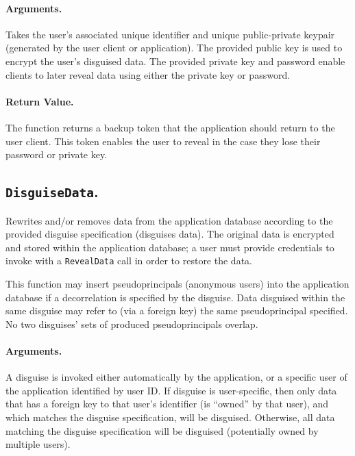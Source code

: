     \paragraph{Arguments.} Takes the user's associated unique identifier and unique
    public-private keypair (generated by the user
    client or application).
    The provided public key is used to encrypt the user's disguised data. The
    provided private key and password enable clients to later reveal data using
    either the private key or password.

    \paragraph{Return Value.} 
    The function returns a backup token that the application should return to
    the user client. This token enables the user to reveal in the case they lose
    their password or private key.


\subsection{\texttt{DisguiseData}.}

    Rewrites and/or removes data from the application database according to the
    provided disguise specification (\ie disguises data). The original data is encrypted
    and stored within the application database; a user must provide credentials
    to invoke with a \texttt{RevealData} call in order to restore the data.
    
    This function may insert pseudoprincipals (anonymous users) into the
    application database if a decorrelation is specified by the disguise.
     Data disguised within the
    same disguise may refer to (via a foreign key) the same pseudoprincipal
    specified.
    No two disguises' sets of produced pseudoprincipals overlap. 

    \paragraph{Arguments.} 
    A disguise is invoked either automatically by the application, or a specific
    user of the application identified by user ID. 
    If disguise is user-specific, then only data that has a foreign key to that
    user's identifier (is ``owned'' by that user), and which matches the
    disguise specification, will be disguised.  Otherwise, all data matching the
    disguise specification will be disguised (potentially owned by multiple
    users). 

